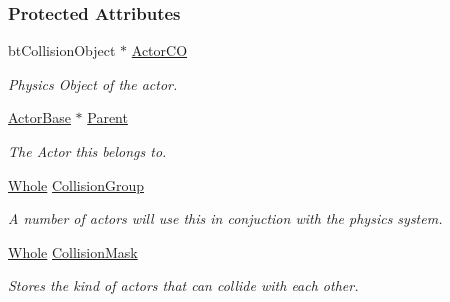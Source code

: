 \subsubsection*{Protected Attributes}
\begin{DoxyCompactItemize}
\item 
\hypertarget{classphys_1_1ActorBasePhysicsSettings_a259d4d10541b28d389ffa287f07ec916}{
btCollisionObject $\ast$ \hyperlink{classphys_1_1ActorBasePhysicsSettings_a259d4d10541b28d389ffa287f07ec916}{ActorCO}}
\label{d2/d61/classphys_1_1ActorBasePhysicsSettings_a259d4d10541b28d389ffa287f07ec916}

\begin{DoxyCompactList}\small\item\em Physics Object of the actor. \item\end{DoxyCompactList}\item 
\hypertarget{classphys_1_1ActorBasePhysicsSettings_a2bd46cc0b9e675c409d5e09772126030}{
\hyperlink{classphys_1_1ActorBase}{ActorBase} $\ast$ \hyperlink{classphys_1_1ActorBasePhysicsSettings_a2bd46cc0b9e675c409d5e09772126030}{Parent}}
\label{d2/d61/classphys_1_1ActorBasePhysicsSettings_a2bd46cc0b9e675c409d5e09772126030}

\begin{DoxyCompactList}\small\item\em The Actor this belongs to. \item\end{DoxyCompactList}\item 
\hypertarget{classphys_1_1ActorBasePhysicsSettings_a6a95b9dceba9a60f87b2ae0f3109b638}{
\hyperlink{namespacephys_a460f6bc24c8dd347b05e0366ae34f34a}{Whole} \hyperlink{classphys_1_1ActorBasePhysicsSettings_a6a95b9dceba9a60f87b2ae0f3109b638}{CollisionGroup}}
\label{d2/d61/classphys_1_1ActorBasePhysicsSettings_a6a95b9dceba9a60f87b2ae0f3109b638}

\begin{DoxyCompactList}\small\item\em A number of actors will use this in conjuction with the physics system. \item\end{DoxyCompactList}\item 
\hypertarget{classphys_1_1ActorBasePhysicsSettings_ae5f0c41d16868bf67e834b643207521f}{
\hyperlink{namespacephys_a460f6bc24c8dd347b05e0366ae34f34a}{Whole} \hyperlink{classphys_1_1ActorBasePhysicsSettings_ae5f0c41d16868bf67e834b643207521f}{CollisionMask}}
\label{d2/d61/classphys_1_1ActorBasePhysicsSettings_ae5f0c41d16868bf67e834b643207521f}

\begin{DoxyCompactList}\small\item\em Stores the kind of actors that can collide with each other. \item\end{DoxyCompactList}\end{DoxyCompactItemize}


